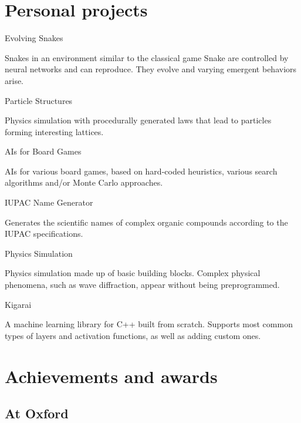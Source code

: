 \documentclass{tccv}
\begin{document}
\newpage


\section{Personal projects}

\begin{projectlist}

\item{Evolving Snakes}

Snakes in an environment similar to the classical game Snake are controlled by neural networks and can reproduce.
They evolve and varying emergent behaviors arise.

\item{Particle Structures}

Physics simulation with procedurally generated laws that lead to particles
forming interesting lattices.

\item{AIs for Board Games}

AIs for various board games, based on hard-coded heuristics, various search algorithms and/or Monte Carlo approaches.

\item{IUPAC Name Generator}

Generates the scientific names of complex organic compounds according to the IUPAC specifications.

\item{Physics Simulation}

Physics simulation made up of basic building blocks.
Complex physical phenomena, such as wave diffraction, appear without being preprogrammed.

\item{Kigarai}

A machine learning library for C++ built from scratch.
Supports most common types of layers and activation functions, as well as adding custom ones.

\end{projectlist}


\section{Achievements and awards}

\subsection{At Oxford}
\end{document}
